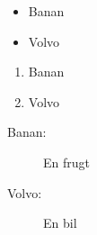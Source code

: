 \documentclass{article}
\begin{document}
\begin{itemize}
\item	Banan
\item	Volvo
\end{itemize}

\begin{enumerate}
\item	Banan
\item	Volvo
\end{enumerate}

\begin{description}
\item[Banan:] En frugt
\item[Volvo:] En bil
\end{description}
\end{document}
